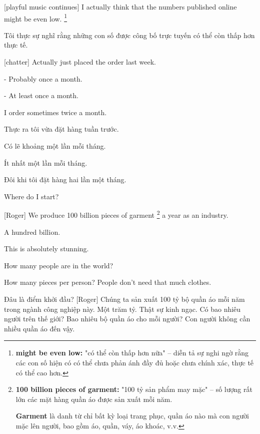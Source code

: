 \documentclass[a4paper]{article}
\begin{document}
	
	[playful music continues]
	I actually think that the numbers published online might be even low. \footnote{
		\textbf{might be even low:} "có thể còn thấp hơn nữa" – diễn tả sự nghi ngờ rằng các con số hiện có có thể chưa phản ánh đầy đủ hoặc chưa chính xác, thực tế có thể cao hơn.
	}
	
	\begin{vietnamese-v2}
		
		Tôi thực sự nghĩ rằng những con số được công bố trực tuyến có thể còn thấp hơn thực tế.
	\end{vietnamese-v2}

	[chatter]
	Actually just placed the order last week.
	
	- Probably once a month. 
	
	- At least once a month.
	
	I order sometimes twice a month.
	
	\begin{vietnamese-v2}
		
		Thực ra tôi vừa đặt hàng tuần trước.
		
		Có lẽ khoảng một lần mỗi tháng.
		
		Ít nhất một lần mỗi tháng.
		
		Đôi khi tôi đặt hàng hai lần một tháng.
	\end{vietnamese-v2}
	
	Where do I start?
	
	[Roger] We produce 100 billion pieces of garment \footnote{
		\textbf{100 billion pieces of garment:} "100 tỷ sản phẩm may mặc" – số lượng rất lớn các mặt hàng quần áo được sản xuất mỗi năm.
	
		\textbf{Garment} là danh từ chỉ bất kỳ loại trang phục, quần áo nào mà con người mặc lên người, bao gồm áo, quần, váy, áo khoác, v.v.
	} a year as an industry.
	
	A hundred billion.
	
	This is absolutely stunning.
	
	How many people are in the world?
	
	How many pieces per person? People don't need that much clothes.
	
	\begin{vietnamese-v2}
		Đâu là điểm khởi đầu? 
		[Roger] Chúng ta sản xuất 100 tỷ bộ quần áo mỗi năm trong ngành công nghiệp này. 
		Một trăm tỷ. 
		Thật sự kinh ngạc. 
		Có bao nhiêu người trên thế giới? Bao nhiêu bộ quần áo cho mỗi người? Con người không cần nhiều quần áo đến vậy.
	\end{vietnamese-v2}
\end{document}

